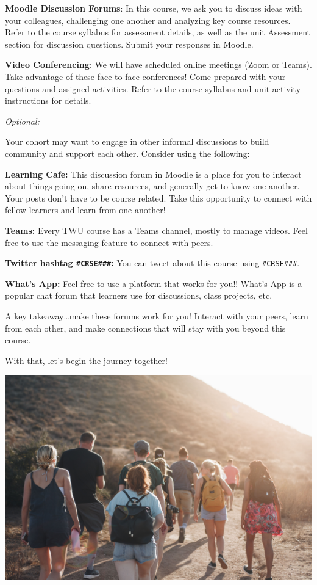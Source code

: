 \documentclass[
]{book}
\begin{document}
\textbf{Moodle Discussion Forums}: In this course, we ask you to discuss ideas with your colleagues, challenging one another and analyzing key course resources. Refer to the course syllabus for assessment details, as well as the unit Assessment section for discussion questions. Submit your responses in Moodle.

\textbf{Video Conferencing}: We will have scheduled online meetings (Zoom or Teams). Take advantage of these face-to-face conferences! Come prepared with your questions and assigned activities. Refer to the course syllabus and unit activity instructions for details.

\emph{Optional:}

Your cohort may want to engage in other informal discussions to build community and support each other. Consider using the following:

\textbf{Learning Cafe:} This discussion forum in Moodle is a place for you to interact about things going on, share resources, and generally get to know one another. Your posts don't have to be course related. Take this opportunity to connect with fellow learners and learn from one another!

\textbf{Teams:} Every TWU course has a Teams channel, mostly to manage videos. Feel free to use the messaging feature to connect with peers.

\textbf{Twitter hashtag \texttt{\#CRSE\#\#\#}:} You can tweet about this course using \texttt{\#CRSE\#\#\#}.

\textbf{What's App:} Feel free to use a platform that works for you!! What's App is a popular chat forum that learners use for discussions, class projects, etc.

A key takeaway\ldots make these forums work for you! Interact with your peers, learn from each other, and make connections that will stay with you beyond this course.

With that, let's begin the journey together!

\includegraphics{assets/community/luke-porter-NEqEC7qa9FM-unsplash.jpg}
\end{document}
